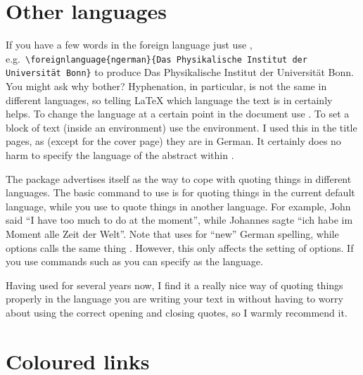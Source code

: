 \section{Other languages}%
\label{sec:layout:lang}

If you have a few words in the foreign language just use
,\\
e.g.\ \texttt{\textbackslash foreignlanguage\{ngerman\}\{Das
  Physikalische Institut der Universität Bonn\}}  to produce \foreignlanguage{ngerman}{Das
  Physikalische Institut der Universität Bonn}. You might ask why
bother? Hyphenation, in particular, is not the same in different
languages, so telling \LaTeX{} which language the text is in certainly
helps. To change the language at a certain point in the document use
. To set a block of text (inside an environment)
use the  environment. I used this in the title
pages, as (except for the cover page) they are in German. It certainly
does no harm to specify the language of the abstract
within .

The  package advertises itself as the way to cope
with quoting things in different languages. The basic
command to use is 
for quoting things in the current default language, while you
use  to quote things in another language. For
example, John said \enquote{I have too much to do at the moment},
while \foreignlanguage{ngerman}{Johannes sagte}
\foreignquote{ngerman}{ich habe im Moment alle Zeit der Welt}.
Note that  uses  for \enquote{new} German
spelling, while  options calls the same thing
. However, this only affects the setting of options. If
you use commands such as  you can specify
 as the language.

Having used  for several years now, I find it a
really nice way of quoting things properly in the language you are
writing your text in without having to worry about using the correct
opening and closing quotes, so I warmly recommend it.

\section{Coloured links}%
\label{sec:layout:link}

